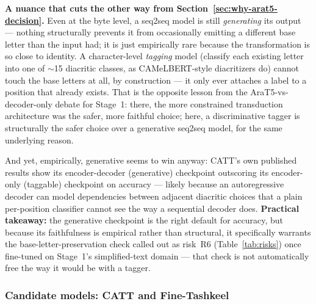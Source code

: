 \documentclass[11pt,a4paper]{article}
\begin{document}
\begin{noteb}
\textbf{A nuance that cuts the other way from Section~\ref{sec:why-arat5-decision}.}
Even at the byte level, a seq2seq model is still \emph{generating} its output
--- nothing structurally prevents it from occasionally emitting a different
base letter than the input had; it is just empirically rare because the
transformation is so close to identity. A character-level \emph{tagging}
model (classify each existing letter into one of $\sim$15 diacritic classes,
as CAMeLBERT-style diacritizers do) cannot touch the base letters at all, by
construction --- it only ever attaches a label to a position that already
exists. That is the opposite lesson from the AraT5-vs-decoder-only debate for
Stage~1: there, the more constrained transduction architecture was the safer,
more faithful choice; here, a discriminative tagger is structurally the safer
choice over a generative seq2seq model, for the same underlying reason.

And yet, empirically, generative seems to win anyway: CATT's own published
results show its encoder-decoder (generative) checkpoint outscoring its
encoder-only (taggable) checkpoint on accuracy --- likely because an
autoregressive decoder can model dependencies between adjacent diacritic
choices that a plain per-position classifier cannot see the way a sequential
decoder does. \textbf{Practical takeaway:} the generative checkpoint is the
right default for accuracy, but because its faithfulness is empirical rather
than structural, it specifically warrants the base-letter-preservation check
called out as risk~R6 (Table~\ref{tab:risks}) once fine-tuned on Stage~1's
simplified-text domain --- that check is not automatically free the way it
would be with a tagger.
\end{noteb}

\subsubsection{Candidate models: CATT and Fine-Tashkeel}
\end{document}
